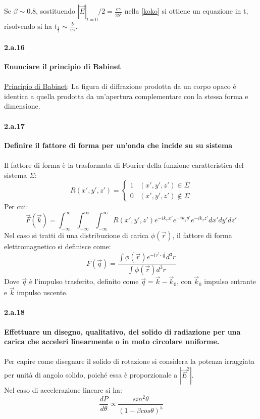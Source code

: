 \documentclass[twoside]{article}
\begin{document}
Se $\beta\sim 0.8$, sostituendo $|\vec{E}|_{t=0}/2=\frac{e\gamma}{2 b^2}$ nella \ref{koko} si ottiene un equazione in t, risolvendo si ha $t_{\frac{1}{2}}\sim\frac{b}{v\gamma}$.\\

\paragraph{2.a.16}\textbf{Enunciare il principio di Babinet}\\
\\
\underline{Principio di Babinet}: La figura di diffrazione prodotta da un corpo opaco è identica a quella prodotta da un’apertura complementare con la stessa forma e dimensione.

\paragraph{2.a.17}\textbf{Definire il fattore di forma per un'onda che incide su su sistema}\\
\\
Il fattore di forma è la trasformata di Fourier della funzione caratteristica del sistema $\Sigma$:
\begin{equation}
    R(x',y',z')=\begin{cases}
        1 & (x',y',z')\in \Sigma\\
        0 & (x',y',z')\notin \Sigma
    \end{cases}
\end{equation}
Per cui:
\begin{equation}
    \vec{F}(\vec{k})=\int_{-\infty}^\infty\int_{-\infty}^\infty\int_{-\infty}^\infty R(x',y',z')e^{-ik_x x'}e^{-ik_y y'}e^{-ik_z z'}dx'dy'dz'
\end{equation}
Nel caso si tratti di una distribuzione di carica $\phi(\vec{r})$, il fattore di forma elettromagnetico si definisce come:
\begin{equation}
    F(\vec{q})=\frac{\int \phi(\vec{r})e^{-i\vec{r}\cdot \vec{q}}d^3r}{\int \phi(\vec{r})d^3r}
\end{equation}
Dove $\vec{q}$ è l'impulso trasferito, definito come $\vec{q}=\vec{k}-\vec{k}_0$, con $\vec{k}_0$ impulso entrante e $\vec{k}$ impulso uscente.
\paragraph{2.a.18}\textbf{Effettuare un disegno, qualitativo, del solido di radiazione per una carica che acceleri linearmente o in moto circolare uniforme.}\\
\\
Per capire come disegnare il solido di rotazione si considera la potenza irraggiata per unità di angolo solido, poiché essa è proporzionale a $|\vec{E}^2|$.\\
Nel caso di accelerazione lineare si ha:
\begin{equation}
    \frac{dP}{d\theta} \propto \frac{sin^2\theta}{(1-\beta cos\theta)^5}
\end{equation}
\end{document}
